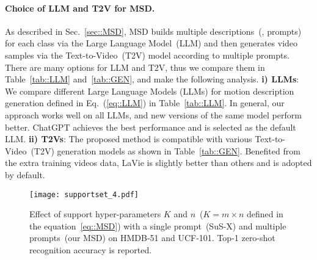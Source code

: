 \paragraph{Choice of LLM and T2V for MSD.}
{
As described in Sec.~\ref{sec::MSD}, MSD builds multiple descriptions~(\ie, prompts) for each class via the Large Language Model~(LLM) and then generates video samples via the Text-to-Video~(T2V) model according to multiple prompts. There are many options for LLM and T2V, thus we compare them in Table~\ref{tab::LLM} and~\ref{tab::GEN}, and make the following analysis.
\textbf{i) LLMs}: We compare different Large Language Models (LLMs) for motion description generation defined in Eq.~(\ref{eq::LLM}) in Table~\ref{tab::LLM}. In general, our approach works well on all LLMs, and new versions of the same model perform better. ChatGPT achieves the best performance and is selected as the default LLM.
\textbf{ii) T2Vs}: The proposed method is compatible with various Text-to-Video~(T2V) generation models as shown in Table~\ref{tab::GEN}. {Benefited from the extra training videos data}, LaVie is slightly better than others and is adopted by default.
}





\begin{figure}[!t]
  \centering
  \texttt{[image: supportset\_4.pdf]}
  \caption{Effect of support hyper-parameters $K$ and $n$~($K = m \times n$ defined in the equation~\ref{eq::MSD}) with a single prompt~(SuS-X) and multiple prompts~(our MSD) on HMDB-51 and UCF-101. Top-1 zero-shot recognition accuracy is reported.}
  \label{fig::sus}
\end{figure}

